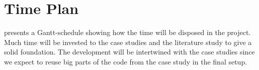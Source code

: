 \chapter{Time Plan}
 presents a Gantt-schedule showing how the time will be disposed in the project. Much time will be invested to the case studies and the literature study to give a solid foundation. The development will be intertwined with the case studies since we expect to reuse big parts of the code from the case study in the final setup.
\nopagebreak
